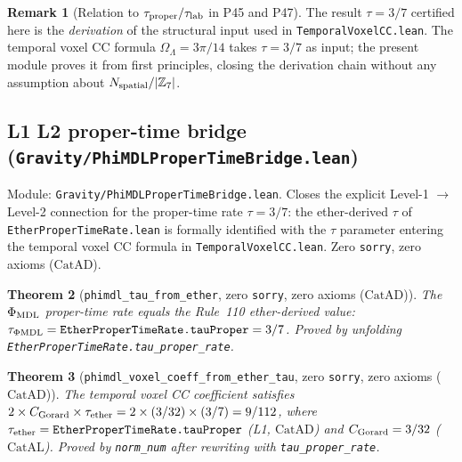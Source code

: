 \documentclass[11pt,a4paper]{article}
\newtheorem{theorem}{Theorem}[section]
\theoremstyle{definition}
\newtheorem{remark}[theorem]{Remark}
\newcommand{\CatAL}{\ensuremath{\mathrm{CatAL}}}
\newcommand{\CatAD}{\ensuremath{\mathrm{CatAD}}}
\begin{document}
\begin{remark}[Relation to $\tau_{\rm proper}/\tau_{\rm lab}$ in P45 and P47]
The result $\tau = 3/7$ certified here is the \emph{derivation} of the structural
input used in \texttt{TemporalVoxelCC.lean}.  The temporal voxel CC formula
$\Omega_\Lambda = 3\pi/14$ takes $\tau = 3/7$ as input; the present module proves
it from first principles, closing the derivation chain without any assumption about
$N_{\rm spatial}/|\mathbb{Z}_7|$.
\end{remark}

\subsection{L1\,\textrightarrow\,L2 proper-time bridge (\texttt{Gravity/PhiMDLProperTimeBridge.lean})}\label{subsec:phimdl-proper-time-bridge}

Module: \texttt{Gravity/PhiMDLProperTimeBridge.lean}.  Closes the explicit
Level-1 $\to$ Level-2 connection for the proper-time rate $\tau = 3/7$: the
ether-derived $\tau$ of \texttt{EtherProperTimeRate.lean} is formally identified
with the $\tau$ parameter entering the temporal voxel CC formula in
\texttt{TemporalVoxelCC.lean}.  Zero \texttt{sorry}, zero axioms (\CatAD).

\begin{theorem}[\lstinline|phimdl_tau_from_ether|, zero \texttt{sorry}, zero axioms ($\CatAD$)]
The $\Phi_{\rm MDL}$ proper-time rate equals the Rule~110 ether-derived value:
$\tau_{\Phi{\rm MDL}} = \texttt{EtherProperTimeRate.tauProper} = 3/7$.
Proved by unfolding \lstinline|EtherProperTimeRate.tau_proper_rate|.
\end{theorem}

\begin{theorem}[\lstinline|phimdl_voxel_coeff_from_ether_tau|, zero \texttt{sorry}, zero axioms ($\CatAD$)]
The temporal voxel CC coefficient satisfies
$2 \times C_{\rm Gorard} \times \tau_{\rm ether} = 2 \times (3/32) \times (3/7) = 9/112$,
where $\tau_{\rm ether} = \texttt{EtherProperTimeRate.tauProper}$ (L1, \CatAD) and
$C_{\rm Gorard} = 3/32$ (\CatAL).  Proved by \lstinline|norm_num| after rewriting
with \lstinline|tau_proper_rate|.
\end{theorem}
\end{document}
